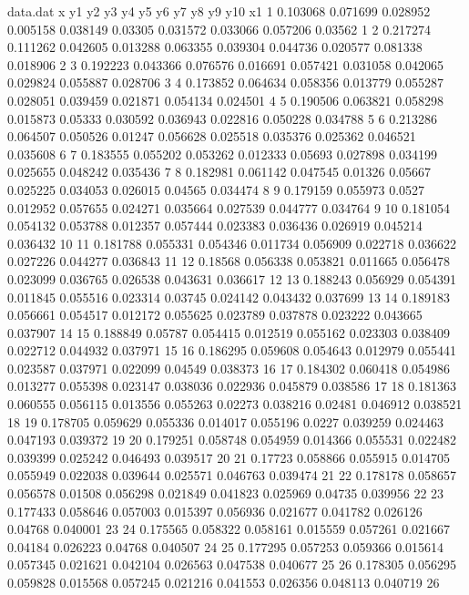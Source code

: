 \documentclass[sigchi,screen]{acmart}
\begin{document}
\begin{filecontents}{data.dat}
x      y1         y2         y3         y4         y5         y6        y7         y8         y9         y10       x1
1      0.103068   0.071699   0.028952   0.005158   0.038149   0.03305   0.031572   0.033066   0.057206   0.03562   1
2      0.217274   0.111262   0.042605   0.013288   0.063355   0.039304   0.044736   0.020577   0.081338   0.018906   2
3      0.192223   0.043366   0.076576   0.016691   0.057421   0.031058   0.042065   0.029824   0.055887   0.028706   3
4      0.173852   0.064634   0.058356   0.013779   0.055287   0.028051   0.039459   0.021871   0.054134   0.024501   4
5      0.190506   0.063821   0.058298   0.015873   0.05333   0.030592   0.036943   0.022816   0.050228   0.034788   5
6      0.213286   0.064507   0.050526   0.01247   0.056628   0.025518   0.035376   0.025362   0.046521   0.035608   6
7      0.183555   0.055202   0.053262   0.012333   0.05693   0.027898   0.034199   0.025655   0.048242   0.035436   7
8      0.182981   0.061142   0.047545   0.01326   0.05667   0.025225   0.034053   0.026015   0.04565   0.034474   8
9      0.179159   0.055973   0.0527   0.012952   0.057655   0.024271   0.035664   0.027539   0.044777   0.034764   9
10      0.181054   0.054132   0.053788   0.012357   0.057444   0.023383   0.036436   0.026919   0.045214   0.036432   10
11      0.181788   0.055331   0.054346   0.011734   0.056909   0.022718   0.036622   0.027226   0.044277   0.036843   11
12      0.18568   0.056338   0.053821   0.011665   0.056478   0.023099   0.036765   0.026538   0.043631   0.036617   12
13      0.188243   0.056929   0.054391   0.011845   0.055516   0.023314   0.03745   0.024142   0.043432   0.037699   13
14      0.189183   0.056661   0.054517   0.012172   0.055625   0.023789   0.037878   0.023222   0.043665   0.037907   14
15      0.188849   0.05787   0.054415   0.012519   0.055162   0.023303   0.038409   0.022712   0.044932   0.037971   15
16      0.186295   0.059608   0.054643   0.012979   0.055441   0.023587   0.037971   0.022099   0.04549   0.038373   16
17      0.184302   0.060418   0.054986   0.013277   0.055398   0.023147   0.038036   0.022936   0.045879   0.038586   17
18      0.181363   0.060555   0.056115   0.013556   0.055263   0.02273   0.038216   0.02481   0.046912   0.038521   18
19      0.178705   0.059629   0.055336   0.014017   0.055196   0.0227   0.039259   0.024463   0.047193   0.039372   19
20      0.179251   0.058748   0.054959   0.014366   0.055531   0.022482   0.039399   0.025242   0.046493   0.039517   20
21      0.17723   0.058866   0.055915   0.014705   0.055949   0.022038   0.039644   0.025571   0.046763   0.039474   21
22      0.178178   0.058657   0.056578   0.01508   0.056298   0.021849   0.041823   0.025969   0.04735   0.039956   22
23      0.177433   0.058646   0.057003   0.015397   0.056936   0.021677   0.041782   0.026126   0.04768   0.040001   23
24      0.175565   0.058322   0.058161   0.015559   0.057261   0.021667   0.04184   0.026223   0.04768   0.040507   24
25      0.177295   0.057253   0.059366   0.015614   0.057345   0.021621   0.042104   0.026563   0.047538   0.040677   25
26      0.178305   0.056295   0.059828   0.015568   0.057245   0.021216   0.041553   0.026356   0.048113   0.040719   26


\end{filecontents}
\end{document}
